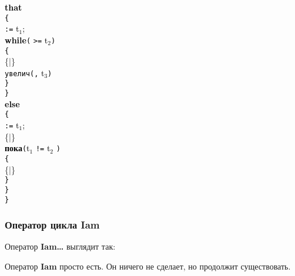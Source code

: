 \documentclass[10pt]{report}
\begin{document}
{{\textcolor{Black}{\textbf{that}}\\
\textcolor{Black}{\texttt{\{}}\\
\phantom{конец} \textcolor{Black}{\texttt{:=}} \textcolor{Black}{t$_1$}\textcolor{Black}{;}\\
\phantom{конец}\textcolor{Black}{\textbf{while}}\textcolor{Black}{\texttt{(}} \textcolor{Black}{\texttt{>=}} \textcolor{Black}{t$_2$}\textcolor{Black}{\texttt{)}}\\
\phantom{конец}\textcolor{Black}{\texttt{\{}}\\
\phantom{конецмоимс}\{|\}\\
\phantom{конецмоимс}\textcolor{Black}{\texttt{увелич}}\textcolor{Black}{\texttt{(}}\textcolor{Black}{\texttt{,}} \textcolor{Black}{t$_3$}\textcolor{Black}{\texttt{)}}\\
\phantom{конец}\textcolor{Black}{\texttt{\}}}\\
\textcolor{Black}{\texttt{\}}}\\
\textcolor{Black}{\textbf{else}}\\
\textcolor{Black}{\texttt{\{}}\\
\phantom{конец} \textcolor{Black}{\texttt{:=}} \textcolor{Black}{t$_1$}\textcolor{Black}{;}\\
\phantom{конец}\{|\}\\
\phantom{конец}\textcolor{Black}{\textbf{пока}}\textcolor{Black}{\texttt{(}}\textcolor{Black}{t$_1$} \textcolor{Black}{\texttt{!=}} \textcolor{Black}{t$_2$}%
\textcolor{Black}{\texttt{)}}\\
\phantom{конец}\textcolor{Black}{\texttt{\{}}\\
\phantom{конецмоимс}\{|\}\\
\phantom{конец}\textcolor{Black}{\texttt{\}}}\\
\textcolor{Black}{\texttt{\}}}\\
\textcolor{Black}{\texttt{\}}}
}}
  \subsubsection{Оператор цикла \glqq Iam\grqq}
  Оператор \textbf{\glqq Iam\dots } выглядит так:
\begin{center}
\textcolor{Green}{}
\end{center}
Оператор \textbf{\glqq Iam\grqq} просто есть. Он ничего не сделает, но продолжит существовать. 
\end{document}
